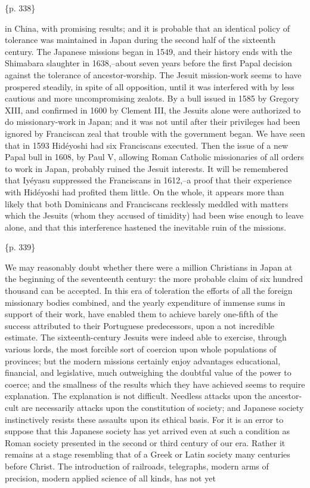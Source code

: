 \{p. 338\}

in China, with promising results; and it is probable that an identical policy of tolerance was maintained in Japan during the second half of the sixteenth century. The Japanese missions began in 1549, and their history ends with the Shimabara slaughter in 1638,--about seven years before the first Papal decision against the tolerance of ancestor-worship. The Jesuit mission-work seems to have prospered steadily, in spite of all opposition, until it was interfered with by less cautious and more uncompromising zealots. By a bull issued in 1585 by Gregory XIII, and confirmed in 1600 by Clement III, the Jesuits alone were authorized to do missionary-work in Japan; and it was not until after their privileges had been ignored by Franciscan zeal that trouble with the government began. We have seen that in 1593 Hidéyoshi had six Franciscans executed. Then the issue of a new Papal bull in 1608, by Paul V, allowing Roman Catholic missionaries of all orders to work in Japan, probably ruined the Jesuit interests. It will be remembered that Iyéyasu suppressed the Franciscans in 1612,--a proof that their experience with Hidéyoshi had profited them little. On the whole, it appears more than likely that both Dominicans and Franciscans recklessly meddled with matters which the Jesuits (whom they accused of timidity) had been wise enough to leave alone, and that this interference hastened the inevitable ruin of the missions.

\{p. 339\}

We may reasonably doubt whether there were a million Christians in Japan at the beginning of the seventeenth century: the more probable claim of six hundred thousand can be accepted. In this era of toleration the efforts of all the foreign missionary bodies combined, and the yearly expenditure of immense sums in support of their work, have enabled them to achieve barely one-fifth of the success attributed to their Portuguese predecessors, upon a not incredible estimate. The sixteenth-century Jesuits were indeed able to exercise, through various lords, the most forcible sort of coercion upon whole populations of provinces; but the modern missions certainly enjoy advantages educational, financial, and legislative, much outweighing the doubtful value of the power to coerce; and the smallness of the results which they have achieved seems to require explanation. The explanation is not difficult. Needless attacks upon the ancestor-cult are necessarily attacks upon the constitution of society; and Japanese society instinctively resists these assaults upon its ethical basis. For it is an error to suppose that this Japanese society has yet arrived even at such a condition as Roman society presented in the second or third century of our era. Rather it remains at a stage resembling that of a Greek or Latin society many centuries before Christ. The introduction of railroads, telegraphs, modern arms of precision, modern applied science of all kinds, has not yet

